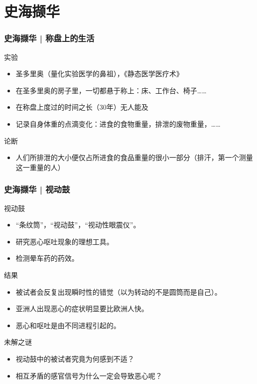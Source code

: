 \section{史海撷华}
\begin{frame}
  \frametitle{史海撷华 | 称盘上的生活}
  \begin{block}{实验}
    \begin{itemize}
      \item 圣多里奥（\alert{量化实验医学}的鼻祖），《静态医学医疗术》
      \item 在圣多里奥的房子里，一切都悬于称上：床、工作台、椅子……
      \item 在称盘上度过的时间之长（30年）无人能及
      \item 记录自身体重的点滴变化：进食的食物重量，排泄的废物重量，……
    \end{itemize}
  \end{block}
  \pause
  \begin{block}{论断}
    \begin{itemize}
      \item 人们所排泄的大小便仅占所进食的食品重量的很小一部分（排汗，第一个测量这一重量的人）
    \end{itemize}
  \end{block}
\end{frame}

\begin{frame}
  \frametitle{史海撷华 | 视动鼓}
  \begin{block}{视动鼓}
    \begin{itemize}
      \item “条纹筒”，“视动鼓”，“视动性眼震仪”。
      \item 研究恶心呕吐现象的理想工具。
      \item 检测晕车药的药效。
    \end{itemize}
  \end{block}
  \pause
  \begin{block}{结果}
    \begin{itemize}
      \item 被试者会反复出现瞬时性的错觉（以为转动的不是圆筒而是自己）。
      \item 亚洲人出现恶心的症状明显要比欧洲人快。
      \item 恶心和呕吐是由不同进程引起的。
    \end{itemize}
  \end{block}
  \pause
  \begin{block}{未解之谜}
    \begin{itemize}
      \item 视动鼓中的被试者究竟为何感到不适？
      \item 相互矛盾的感官信号为什么一定会导致恶心呢？
    \end{itemize}
  \end{block}
\end{frame}

